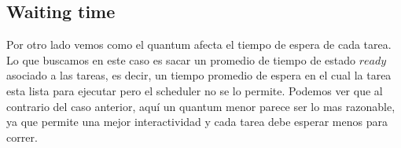 \subsection{Waiting time}

Por otro lado vemos como el quantum afecta el tiempo de espera de cada tarea. Lo que buscamos en este caso es sacar un promedio de tiempo de estado $ready$ asociado a las tareas, es decir, un tiempo promedio de espera en el cual la tarea esta lista para ejecutar pero el scheduler no se lo permite.
Podemos ver que al contrario del caso anterior, aquí un quantum menor parece ser lo mas razonable, ya que permite una mejor interactividad y cada tarea debe esperar menos para correr.

